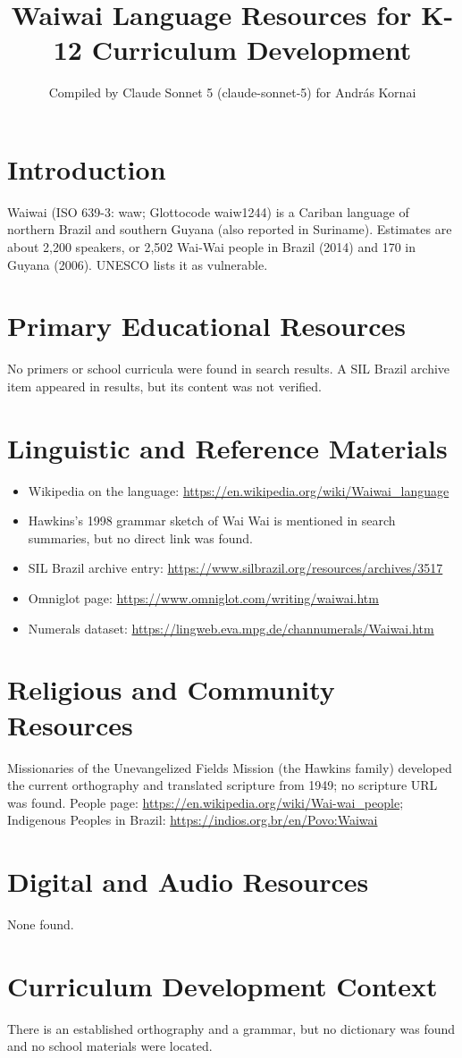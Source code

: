 \documentclass[12pt]{article}
\title{Waiwai Language Resources for K-12 Curriculum Development}
\author{Compiled by Claude Sonnet 5 (claude-sonnet-5) for Andr\'as Kornai}
\date{}
\begin{document}
\maketitle
\section{Introduction}
Waiwai (ISO 639-3: waw; Glottocode waiw1244) is a Cariban language of northern Brazil and southern Guyana (also reported in Suriname). Estimates are about 2,200 speakers, or 2,502 Wai-Wai people in Brazil (2014) and 170 in Guyana (2006). UNESCO lists it as vulnerable.
\section{Primary Educational Resources}
No primers or school curricula were found in search results. A SIL Brazil archive item appeared in results, but its content was not verified.
\section{Linguistic and Reference Materials}
\begin{itemize}
\item Wikipedia on the language: \url{https://en.wikipedia.org/wiki/Waiwai_language}
\item Hawkins's 1998 grammar sketch of Wai Wai is mentioned in search summaries, but no direct link was found.
\item SIL Brazil archive entry: \url{https://www.silbrazil.org/resources/archives/3517}
\item Omniglot page: \url{https://www.omniglot.com/writing/waiwai.htm}
\item Numerals dataset: \url{https://lingweb.eva.mpg.de/channumerals/Waiwai.htm}
\end{itemize}
\section{Religious and Community Resources}
Missionaries of the Unevangelized Fields Mission (the Hawkins family) developed the current orthography and translated scripture from 1949; no scripture URL was found. People page: \url{https://en.wikipedia.org/wiki/Wai-wai_people}; Indigenous Peoples in Brazil: \url{https://indios.org.br/en/Povo:Waiwai}
\section{Digital and Audio Resources}
None found.
\section{Curriculum Development Context}
There is an established orthography and a grammar, but no dictionary was found and no school materials were located.
\end{document}
